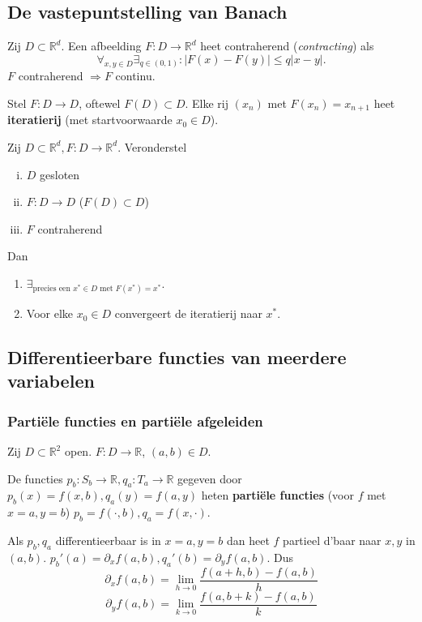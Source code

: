 \documentclass{2wa40summary}
\begin{document}
		\subsection{De vastepuntstelling van Banach}
			Zij $D \subset \mathbb{R}^d$. Een afbeelding $F:D \rightarrow \mathbb{R}^d$ heet contraherend (\textit{contracting}) als
			\[\forall _{x,y\in D}\exists _{q \in (0,1)}:|F(x)-F(y)| \leq q|x-y|. \]
			\opm $F$ contraherend $\Rightarrow F$ continu.
			
			Stel $F:D\rightarrow D$, oftewel $F(D) \subset D$. Elke rij $(x_n)$ met $F(x_n) = x_{n+1}$ heet \textbf{iteratierij} (met startvoorwaarde $x_0 \in D$).
			
			Zij $D \subset \mathbb{R}^d, F:D\rightarrow \mathbb{R}^d$. Veronderstel
			\begin{enumerate}[(i)]
				\item $D$ gesloten
				\item $F:D \rightarrow D$ ($F(D) \subset D$)
				\item $F$ contraherend
			\end{enumerate}
			Dan
			\begin{enumerate}[(1)]
				\item $\exists _{\text{precies een } x^* \in D \text{ met } F(x^*)=x^*}$.
				\item Voor elke $x_0 \in D$ convergeert de iteratierij naar $x^*$.
			\end{enumerate}
		
		\subsection{Differentieerbare functies van meerdere variabelen}
		\subsubsection{Parti\"ele functies en parti\"ele afgeleiden}
			Zij $D \subset \mathbb{R}^2$ open. $F:D \rightarrow \mathbb{R}$, $(a,b) \in D$.
			
			De functies $p_b:S_b \rightarrow \mathbb{R}, q_a:T_a \rightarrow \mathbb{R}$ gegeven door $p_b(x)=f(x,b), q_a(y)=f(a,y)$ heten \textbf{parti\"ele functies} (voor $f$ met $x=a, y=b$)
			\nota $p_b=f(\cdot, b), q_a=f(x,\cdot)$.
			
			Als $p_b, q_a$ differentieerbaar is in $x=a,y=b$ dan heet $f$ partieel d'baar naar $x,y$ in $(a,b)$.
			\nota $p_b'(a)=\partial_x f(a,b), q_a'(b)=\partial_y f(a,b)$. Dus \[\partial_x f(a,b)=\lim_{h \rightarrow 0} \frac{f(a+h,b)-f(a,b)}{h}\]\[\partial_y f(a,b)=\lim_{k \rightarrow 0} \frac{f(a,b+k)-f(a,b)}{k}\]
\end{document}
